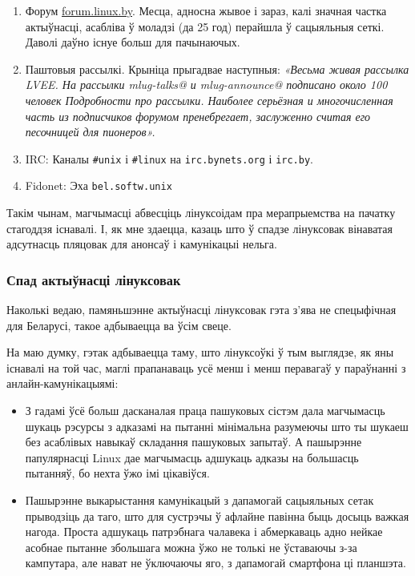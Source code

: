 \documentclass[10pt, a5paper]{article}
\def\vv!#1!{\texttt{#1}}
\begin{document}
\begin{enumerate}
  \item Форум \url{forum.linux.by}. Месца, адносна жывое і зараз, калі значная частка актыўнасці, асабліва ў моладзі (да 25 год) перайшла ў сацыяльныя сеткі. Даволі даўно існуе больш для пачынаючых.
  \item Паштовыя рассылкі. Крыніца прыгадвае наступныя: \textit{«Весьма живая рассылка LVEE. На рассылки mlug-talks@ и mlug-announce@ подписано около 100 человек Подробности про рассылки. Наиболее серьёзная и многочисленная часть из подписчиков форумом пренебрегает, заслуженно считая его песочницей для пионеров».}
  \item IRC: Каналы \vv!\#unix! і \vv!\#linux! на \vv!irc.bynets.org! і \vv!irc.by!.
  \item Fidonet: Эха \vv!bel.softw.unix!
\end{enumerate}

Такім чынам, магчымасці абвесціць лінуксоідам пра мерапрыемства на пачатку стагоддзя існавалі. І, як мне здаецца, казаць што ў спадзе лінуксовак вінаватая адсутнасць пляцовак для анонсаў і камунікацыі нельга.

\subsubsection*{Спад актыўнасці лінуксовак}

Наколькі ведаю, памяньшэнне актыўнасці лінуксовак гэта з'ява не спецыфічная для Беларусі, такое адбываецца ва ўсім свеце.

На маю думку, гэтак адбываецца таму, што лінуксоўкі ў тым выглядзе, як яны існавалі на той час, маглі прапанаваць усё менш і менш перавагаў у параўнанні з анлайн-камунікацыямі:
\begin{itemize}
  \item З гадамі ўсё больш дасканалая праца пашуковых сістэм дала магчымасць шукаць рэсурсы з адказамі на пытанні мінімальна разумеючы што ты шукаеш без асаблівых навыкаў складання пашуковых запытаў. А пашырэнне папулярнасці Linux дае магчымасць адшукаць адказы на большасць пытанняў, бо нехта ўжо імі цікавіўся.
  \item Пашырэнне выкарыстання камунікацый з дапамогай сацыяльных сетак прыводзіць да таго, што для сустрэчы ў афлайне павінна быць досыць важкая нагода. Проста адшукаць патрэбнага чалавека і абмеркаваць адно нейкае асобнае пытанне збольшага можна ўжо не толькі не ўставаючы з-за кампутара, але нават не ўключаючы яго, з дапамогай смартфона ці планшэта.
\end{itemize}
\end{document}
